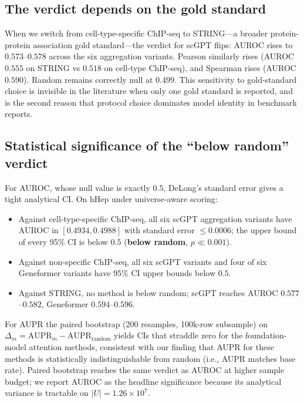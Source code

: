 \documentclass[sigconf]{acmart}
\begin{document}
\subsection{The verdict depends on the gold standard}
\label{sec:gold_dependence}

When we switch from cell-type-specific ChIP-seq to STRING---a broader
protein-protein association gold standard---the verdict for scGPT
flips: AUROC rises to $0.573$--$0.578$ across the six aggregation
variants. Pearson similarly rises (AUROC $0.555$ on STRING vs $0.518$
on cell-type ChIP-seq), and Spearman rises (AUROC $0.590$). Random
remains correctly null at $0.499$. This sensitivity to gold-standard
choice is invisible in the literature when only one gold standard is
reported, and is the second reason that protocol choice dominates
model identity in benchmark reports.

\subsection{Statistical significance of the ``below random'' verdict}
\label{sec:below_random}

For AUROC, whose null value is exactly $0.5$, DeLong's standard error
gives a tight analytical CI. On hHep under universe-aware scoring:
\begin{itemize}
\item Against cell-type-specific ChIP-seq, all six scGPT aggregation
variants have AUROC in $[0.4934, 0.4988]$ with standard error $\le
0.0006$; the upper bound of every 95\% CI is below $0.5$
(\textbf{below random}, $p \ll 0.001$).
\item Against non-specific ChIP-seq, all six scGPT variants and four
of six Geneformer variants have 95\% CI upper bounds below $0.5$.
\item Against STRING, no method is below random; scGPT reaches AUROC
$0.577$--$0.582$, Geneformer $0.594$--$0.596$.
\end{itemize}

For AUPR the paired bootstrap (200 resamples, 100k-row subsample) on
$\Delta_m = \text{AUPR}_m - \text{AUPR}_{\text{random}}$ yields CIs that
straddle zero for the foundation-model attention methods, consistent
with our finding that AUPR for these methods is statistically
indistinguishable from random (i.e., AUPR matches base rate). Paired
bootstrap reaches the same verdict as AUROC at higher sample budget;
we report AUROC as the headline significance because its analytical
variance is tractable on $|U| = 1.26 \times 10^7$.
\end{document}
